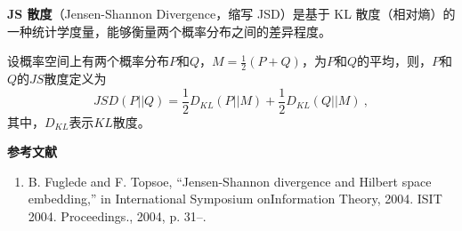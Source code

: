 

\textbf{JS 散度}（Jensen-Shannon Divergence，缩写 JSD）是基于 KL 散度（相对熵）的一种统计学度量，能够衡量两个概率分布之间的差异程度。

设概率空间上有两个概率分布$P$和$Q$，$M=\frac{1}{2}(P+Q)$，为$P$和$Q$的平均，则，$P$和$Q$的$JS$散度定义为
\begin{equation}
JSD(P||Q)=\frac{1}{2}D_{KL}(P||M)+\frac{1}{2}D_{KL}(Q||M)~,
\end{equation}
其中，$D_{KL}$表示$KL$散度。



\textbf{参考文献}
\begin{enumerate}
\item B. Fuglede and F. Topsoe, “Jensen-Shannon divergence and Hilbert space embedding,” in International Symposium onInformation Theory, 2004. ISIT 2004. Proceedings., 2004, p. 31–.
\end{enumerate}